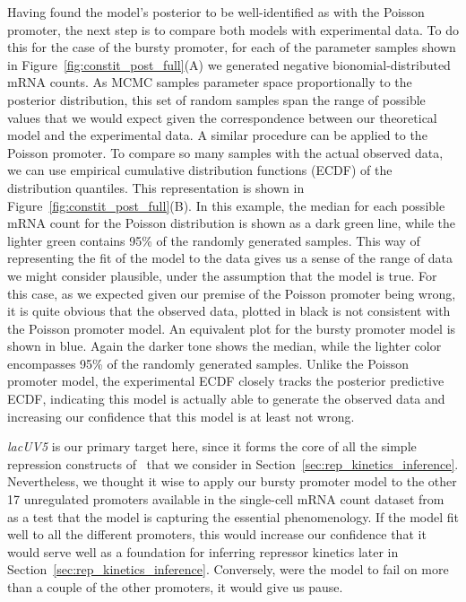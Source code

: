 Having found the model's posterior to be well-identified as with the Poisson
promoter, the next step is to compare both models with experimental data. To do
this for the case of the bursty promoter, for each of the parameter samples
shown in Figure~\ref{fig:constit_post_full}(A) we generated negative
bionomial-distributed mRNA counts. As MCMC samples parameter space
proportionally to the posterior distribution, this set of random samples span
the range of possible values that we would expect given the correspondence
between our theoretical model and the experimental data. A similar procedure can
be applied to the Poisson promoter. To compare so many samples with the actual
observed data, we can use empirical cumulative distribution functions (ECDF) of
the distribution quantiles. This representation is shown in
Figure~\ref{fig:constit_post_full}(B). In this example, the median for each
possible mRNA count for the Poisson distribution is shown as a dark green line,
while the lighter green contains 95\% of the randomly generated samples. This
way of representing the fit of the model to the data gives us a sense of the
range of data we might consider plausible, under the assumption that the model
is true. For this case, as we expected given our premise of the Poisson promoter
being wrong, it is quite obvious that the observed data, plotted in black is not
consistent with the Poisson promoter model. An equivalent plot for the bursty
promoter model is shown in blue. Again the darker tone shows the median, while
the lighter color encompasses 95\% of the randomly generated samples. Unlike the
Poisson promoter model, the experimental ECDF closely tracks the posterior
predictive ECDF, indicating this model is actually able to generate the observed
data and increasing our confidence that this model is at least not wrong.

\textit{lacUV5} is our primary target here, since it forms the core of all the
simple repression constructs of~\cite{Jones2014} that we consider in
Section~\ref{sec:rep_kinetics_inference}. Nevertheless, we thought it wise to
apply our bursty promoter model to the other 17 unregulated promoters available
in the single-cell mRNA count dataset from~\cite{Jones2014} as a test that the
model is capturing the essential phenomenology. If the model fit well to all the
different promoters, this would increase our confidence that it would serve well
as a foundation for inferring repressor kinetics later in
Section~\ref{sec:rep_kinetics_inference}. Conversely, were the model to fail on
more than a couple of the other promoters, it would give us pause.

